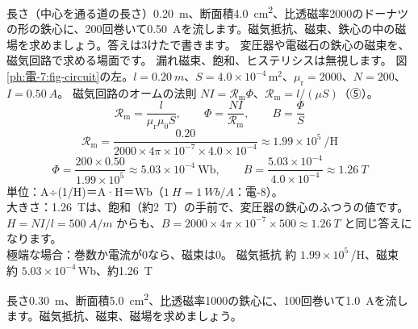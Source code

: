 \label{ph:電-7:ex3}
\begin{phreidai}[鉄心の磁気回路]
長さ（中心を通る道の長さ）\qty{0.20}{m}、断面積\qty{4.0}{cm^2}、比透磁率2000のドーナツの形の鉄心に、200回巻いて\qty{0.50}{A}を流します。磁気抵抗、磁束、鉄心の中の磁場を求めましょう。答えは3けたで書きます。
\phbamen
変圧器や電磁石の鉄心の磁束を、磁気回路で求める場面です。
\phmushi
漏れ磁束、飽和、ヒステリシスは無視します。
\phzu
図\ref{ph:電-7:fig-circuit}の左。$l=\qty{0.20}{m}$、$S=4.0\times10^{-4}$\,m$^2$、$\mu_{\mathrm r}=2000$、$N=200$、$I=\qty{0.50}{A}$。
\phriyu
磁気回路のオームの法則 $NI=\mathcal R_{\mathrm m}\Phi$、$\mathcal R_{\mathrm m}=l/(\mu S)$（⑤）。
\phtateru
\[\mathcal R_{\mathrm m}=\frac{l}{\mu_{\mathrm r}\mu_0S},\qquad\Phi=\frac{NI}{\mathcal R_{\mathrm m}},\qquad B=\frac{\Phi}{S}\]
\phtoku
\[\mathcal R_{\mathrm m}=\frac{0.20}{2000\times4\pi\times10^{-7}\times4.0\times10^{-4}}\approx1.99\times10^5\ \text{/H}\]
\[\Phi=\frac{200\times0.50}{1.99\times10^5}\approx5.03\times10^{-4}\ \text{Wb},\qquad B=\frac{5.03\times10^{-4}}{4.0\times10^{-4}}\approx\qty{1.26}{T}\]
\phtashikame
単位：A÷(1/H)＝A·H＝Wb（$\qty{1}{H}=\qty{1}{Wb/A}$：電-8）。\\
大きさ：\qty{1.26}{T}は、飽和（約\qty{2}{T}）の手前で、変圧器の鉄心のふつうの値です。$H=NI/l=\qty{500}{A/m}$ からも、$B=2000\times4\pi\times10^{-7}\times500\approx\qty{1.26}{T}$ と同じ答えになります。\\
極端な場合：巻数か電流が0なら、磁束は0。
\kotae 磁気抵抗 約 $1.99\times10^5$\,/H、磁束 約 $5.03\times10^{-4}$\,Wb、約\qty{1.26}{T}
\end{phreidai}
\begin{jibun}
長さ\qty{0.30}{m}、断面積\qty{5.0}{cm^2}、比透磁率1000の鉄心に、100回巻いて\qty{1.0}{A}を流します。磁気抵抗、磁束、磁場を求めましょう。
\end{jibun}

